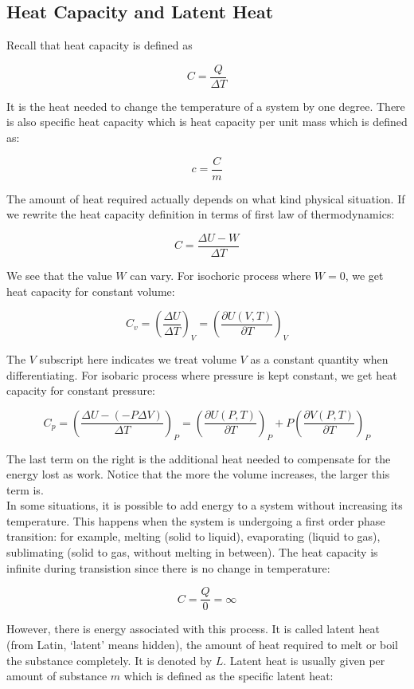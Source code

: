 \documentclass[12pt, a4paper]{article}
\newcounter{exa}
\begin{document}
\subsection{Heat Capacity and Latent Heat}

Recall that heat capacity is defined as

\[C=\frac{Q}{\Delta T}\]

It is the heat needed to change the temperature of a system by one degree. There is also specific heat capacity which is heat capacity per unit mass which is defined as:

\[c=\frac{C}{m}\]

The amount of heat required actually depends on what kind physical situation. If we rewrite the heat capacity definition in terms of first law of thermodynamics:

\[C=\frac{\Delta U - W}{\Delta T}\]

We see that the value $W$ can vary. For isochoric process where $W=0$, we get heat capacity for constant volume:

\[C_v=\left( \frac{\Delta U}{\Delta T} \right)_V=\left( \frac{\partial U(V,T)}{\partial T} \right)_V\]

The $V$ subscript here indicates we treat volume $V$ as a constant quantity when differentiating. For isobaric process where pressure is kept constant, we get heat capacity for constant pressure:

\[C_p=\left( \frac{\Delta U - (-P\Delta V)}{\Delta T} \right)_P=\left( \frac{\partial U(P,T)}{\partial T} \right)_P+P\left( \frac{\partial V(P,T)}{\partial T} \right)_P\]

The last term on the right is the additional heat needed to compensate for the energy lost as work. Notice that the more the volume increases, the larger this term is. \\

In some situations, it is possible to add energy to a system without increasing its temperature. This happens when the system is undergoing a first order phase transition: for example, melting (solid to liquid), evaporating (liquid to gas), sublimating (solid to gas, without melting in between). The heat capacity is infinite during transistion since there is no change in temperature:

\[C=\frac{Q}{0}=\infty\]

However, there is energy associated with this process. It is called latent heat (from Latin, `latent' means hidden), the amount of heat required to melt or boil the substance completely. It is denoted by $L$. Latent heat is usually given per amount of substance $m$ which is defined as the specific latent heat:
\end{document}
